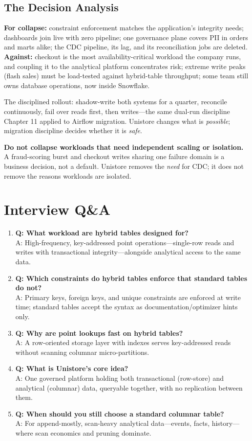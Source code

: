 \subsection{The Decision Analysis}
\textbf{For collapse:} constraint enforcement matches the application's integrity needs; dashboards join live with zero pipeline; one governance plane covers PII in orders and marts alike; the CDC pipeline, its lag, and its reconciliation jobs are deleted. \textbf{Against:} checkout is the most availability-critical workload the company runs, and coupling it to the analytical platform concentrates risk; extreme write peaks (flash sales) must be load-tested against hybrid-table throughput; some team still owns database operations, now inside Snowflake.

The disciplined rollout: shadow-write both systems for a quarter, reconcile continuously, fail over reads first, then writes---the same dual-run discipline Chapter 11 applied to Airflow migration. Unistore changes what is \emph{possible}; migration discipline decides whether it is \emph{safe}.

\begin{pitfall}
\textbf{Do not collapse workloads that need independent scaling or isolation.} A fraud-scoring burst and checkout writes sharing one failure domain is a business decision, not a default. Unistore removes the \emph{need} for CDC; it does not remove the reasons workloads are isolated.
\end{pitfall}

\section{Interview Q\&A}
\begin{enumerate}
    \item \textbf{Q: What workload are hybrid tables designed for?}\\
    A: High-frequency, key-addressed point operations---single-row reads and writes with transactional integrity---alongside analytical access to the same data.
    \item \textbf{Q: Which constraints do hybrid tables enforce that standard tables do not?}\\
    A: Primary keys, foreign keys, and unique constraints are enforced at write time; standard tables accept the syntax as documentation/optimizer hints only.
    \item \textbf{Q: Why are point lookups fast on hybrid tables?}\\
    A: A row-oriented storage layer with indexes serves key-addressed reads without scanning columnar micro-partitions.
    \item \textbf{Q: What is Unistore's core idea?}\\
    A: One governed platform holding both transactional (row-store) and analytical (columnar) data, queryable together, with no replication between them.
    \item \textbf{Q: When should you still choose a standard columnar table?}\\
    A: For append-mostly, scan-heavy analytical data---events, facts, history---where scan economics and pruning dominate.
\end{enumerate}

